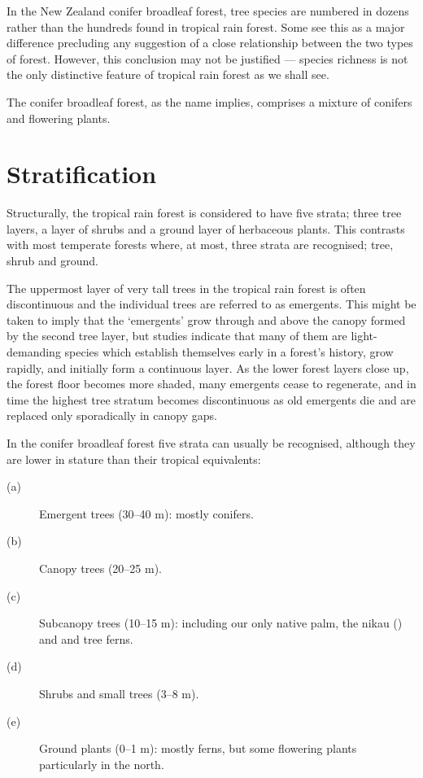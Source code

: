 In the New Zealand conifer broadleaf forest, tree species are numbered in dozens rather than the hundreds found in tropical rain forest.
Some see this as a major difference precluding any suggestion of a close relationship between the two types of forest.
However, this conclusion may not be justified --- species richness is not the only distinctive feature of tropical rain forest as we shall see.

The conifer broadleaf forest, as the name implies, comprises a mixture of conifers and flowering plants.

\section{Stratification}

Structurally, the tropical rain forest is considered to have five strata; three tree layers, a layer of shrubs and a ground layer of herbaceous plants.
This contrasts with most temperate forests where, at most, three strata are recognised; tree, shrub and ground.

The uppermost layer of very tall trees in the tropical rain forest is often discontinuous and the individual trees are referred to as emergents.
This might be taken to imply that the `emergents' grow through and above the canopy formed by the second tree layer, but studies indicate that many of them are light-demanding species which establish themselves early in a forest's history, grow rapidly, and initially form a continuous layer.
As the lower forest layers close up, the forest floor becomes more shaded, many emergents cease to regenerate, and in time the highest tree stratum becomes discontinuous as old emergents die and are replaced only sporadically in canopy gaps.

In the conifer broadleaf forest five strata can usually be recognised, although they are lower in stature than their tropical equivalents:
\begin{description}
\item[{(a)}]Emergent trees (30--40 m): mostly conifers.
\item[{(b)}]Canopy trees (20--25 m).
\item[{(c)}]Subcanopy trees (10--15 m): including our only native palm, the nikau () and  and  tree ferns.
\item[{(d)}]Shrubs and small trees (3--8 m).
\item[{(e)}]Ground plants (0--1 m): mostly ferns, but some flowering plants particularly in the north.
\end{description}
